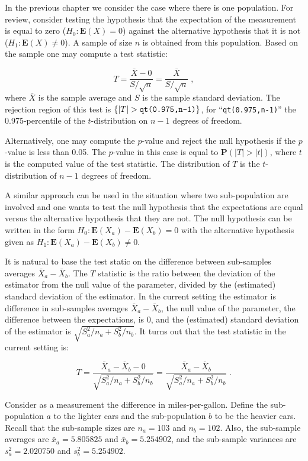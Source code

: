 \documentclass[]{krantz}
\newcommand{\Expec}{\mathbf{E}}
\newcommand{\Prob}{\mathbf{P}}
\theoremstyle{definition}
\theoremstyle{definition}
\theoremstyle{definition}
\theoremstyle{remark}
\begin{document}
In the previous chapter we consider the case where there is one
population. For review, consider testing the hypothesis that the
expectation of the measurement is equal to zero (\(H_0: \Expec(X) = 0\))
against the alternative hypothesis that it is not
(\(H_1: \Expec(X) \not = 0\)). A sample of size \(n\) is obtained from this
population. Based on the sample one may compute a test statistic:

\[T = \frac{\bar X - 0}{S/\sqrt{n}} = \frac{\bar X}{S/\sqrt{n}}\;,\]
where \(\bar X\) is the sample average and \(S\) is the sample standard
deviation. The rejection region of this test is
\(\{|T| > \mbox{\texttt{qt(0.975,n-1)}}\}\), for ``\texttt{qt(0.975,n-1)}'' the
0.975-percentile of the \(t\)-distribution on \(n-1\) degrees of freedom.

Alternatively, one may compute the \(p\)-value and reject the null
hypothesis if the \(p\)-value is less than 0.05. The \(p\)-value in this
case is equal to \(\Prob(|T| > |t|)\), where \(t\) is the computed value of
the test statistic. The distribution of \(T\) is the \(t\)-distribution of
\(n-1\) degrees of freedom.

A similar approach can be used in the situation where two sub-population
are involved and one wants to test the null hypothesis that the
expectations are equal versus the alternative hypothesis that they are
not. The null hypothesis can be written in the form
\(H_0:\Expec(X_a) - \Expec(X_b) = 0\) with the alternative hypothesis
given as \(H_1:\Expec(X_a) - \Expec(X_b) \not = 0\).

It is natural to base the test static on the difference between
sub-samples averages \(\bar X_a - \bar X_b\). The \(T\) statistic is the
ratio between the deviation of the estimator from the null value of the
parameter, divided by the (estimated) standard deviation of the
estimator. In the current setting the estimator is difference in
sub-samples averages \(\bar X_a - \bar X_b\), the null value of the
parameter, the difference between the expectations, is 0, and the
(estimated) standard deviation of the estimator is
\(\sqrt{S_a^2/n_a + S_b^2/n_b}\). It turns out that the test statistic in
the current setting is:

\[T = \frac{\bar X_a - \bar X_b - 0}{ \sqrt{S_a^2/n_a + S^2_b/n_b}} = \frac{\bar X_a - \bar X_b}{ \sqrt{S_a^2/n_a + S^2_b/n_b}}\;.\]

Consider as a measurement the difference in miles-per-gallon. Define the
sub-population \(a\) to the lighter cars and the sub-population \(b\) to be
the heavier cars. Recall that the sub-sample sizes are \(n_a =103\) and
\(n_b=102\). Also, the sub-sample averages are \(\bar x_a = 5.805825\) and
\(\bar x_b =5.254902\), and the sub-sample variances are
\(s^2_a = 2.020750\) and \(s_b^2 = 5.254902\).
\end{document}
